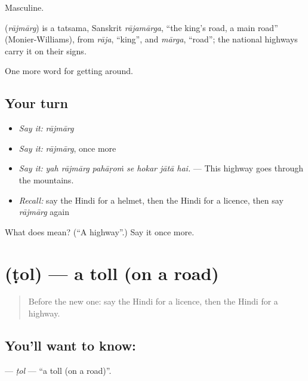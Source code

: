 Masculine.

\begin{cousinweb}
\textbf{} (\emph{rājmārg}) is a tatsama, Sanskrit \emph{rājamārga}, \textquotedblleft{}the king's road, a main road\textquotedblright{} (Monier-Williams), from \emph{rāja}, \textquotedblleft{}king\textquotedblright{}, and \emph{mārga}, \textquotedblleft{}road\textquotedblright{}; the national highways carry it on their signs.
\end{cousinweb}

\begin{grammarlens}[title={What you've built}]
One more word for getting around.
\end{grammarlens}

\subsection*{Your turn}
\begin{itemize}
\raggedright
  \item \emph{Say it:} \emph{rājmārg}
  \item \emph{Say it:} \emph{rājmārg}, once more
  \item \emph{Say it:} \emph{yah rājmārg pahāṛoṁ se hokar jātā hai.} — This highway goes through the mountains.
  \item \emph{Recall:} say the Hindi for a helmet, then the Hindi for a licence, then say \emph{rājmārg} again
\end{itemize}

\begin{tcolorbox}[breakable,colback=teal!4,colframe=teal!35!black,title={Before you move on}]
What does  mean? (\textquotedblleft{}A highway\textquotedblright{}.) Say it once more.
\end{tcolorbox}
\section[\texorpdfstring{\hi{टोल} (ṭol)}{टोल (ṭol)}]{ (ṭol) — a toll (on a road)}

\label{lesson:HI-C407-tol}



\begin{quote}
Before the new one: say the Hindi for a licence, then the Hindi for a highway.
\end{quote}

\subsection*{You'll want to know: }
\textbf{} — \emph{ṭol} — \textquotedblleft{}a toll (on a road)\textquotedblright{}.

